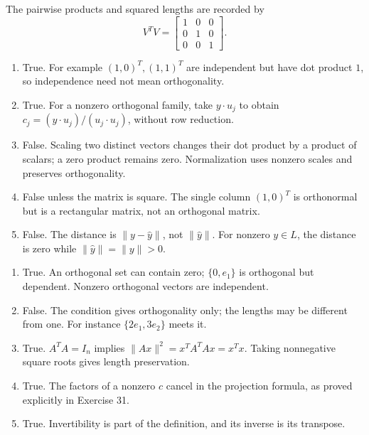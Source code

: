 The pairwise products and squared lengths are recorded by
\[V^TV=\left[\begin{array}{rrr}1&0&0\\0&1&0\\0&0&1\end{array}\right].\]

\begin{enumerate}[label=(\alph*)]
\item True. For example $(1,0)^T,(1,1)^T$ are independent but have
dot product $1$, so independence need not mean orthogonality.
\item True. For a nonzero orthogonal family, take $y\cdot u_j$ to obtain
$c_j=(y\cdot u_j)/(u_j\cdot u_j)$, without row reduction.
\item False. Scaling two distinct vectors changes their dot product by
a product of scalars; a zero product remains zero. Normalization uses
nonzero scales and preserves orthogonality.
\item False unless the matrix is square. The single column $(1,0)^T$
is orthonormal but is a rectangular matrix, not an orthogonal matrix.
\item False. The distance is $\|y-\widehat y\|$, not $\|\widehat y\|$.
For nonzero $y\in L$, the distance is zero while $\|\widehat y\|=\|y\|>0$.
\end{enumerate}

\begin{enumerate}[label=(\alph*)]
\item True. An orthogonal set can contain zero; $\{0,e_1\}$ is
orthogonal but dependent. Nonzero orthogonal vectors are independent.
\item False. The condition gives orthogonality only; the lengths may
be different from one. For instance $\{2e_1,3e_2\}$ meets it.
\item True. $A^TA=I_n$ implies $\|Ax\|^2=x^TA^TAx=x^Tx$.
Taking nonnegative square roots gives length preservation.
\item True. The factors of a nonzero $c$ cancel in the projection
formula, as proved explicitly in Exercise 31.
\item True. Invertibility is part of the definition, and its inverse is
its transpose.
\end{enumerate}


